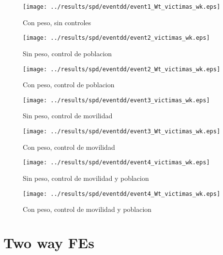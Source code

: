 \documentclass[11pt,letterpaper]{article}
\begin{document}
\begin{figure}[H]
\caption{Con peso, sin controles}
\centering
\texttt{[image: ../results/spd/eventdd/event1\_Wt\_victimas\_wk.eps]}
\end{figure}
\begin{figure}[hbtp]
\caption{Sin peso, control de poblacion}
\centering
\texttt{[image: ../results/spd/eventdd/event2\_victimas\_wk.eps]}
\end{figure}

\begin{figure}[H]
\caption{Con peso, control de poblacion}
\centering
\texttt{[image: ../results/spd/eventdd/event2\_Wt\_victimas\_wk.eps]}
\end{figure}
\begin{figure}[H]
\caption{Sin peso, control de movilidad}
\centering
\texttt{[image: ../results/spd/eventdd/event3\_victimas\_wk.eps]}
\end{figure}

\begin{figure}[H]
\caption{Con peso, control de movilidad}
\centering
\texttt{[image: ../results/spd/eventdd/event3\_Wt\_victimas\_wk.eps]}
\end{figure}
\begin{figure}[H]
\caption{Sin peso, control de movilidad y poblacion}
\centering
\texttt{[image: ../results/spd/eventdd/event4\_victimas\_wk.eps]}
\end{figure}

\begin{figure}[H]
\caption{Con peso, control de movilidad y poblacion}
\centering
\texttt{[image: ../results/spd/eventdd/event4\_Wt\_victimas\_wk.eps]}
\end{figure}

\section{Two way FEs}
\end{document}
